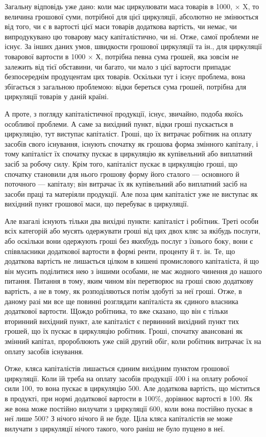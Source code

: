 Загальну відповідь уже дано: коли має циркулювати маса товарів в
1000, × X, то величина грошової суми, потрібної для цієї циркуляції,
абсолютно не змінюється від того, чи є в вартості цієї маси товарів
додаткова вартість, чи немає, чи випродукувано цю товарову масу
капіталістично, чи ні. Отже, самої проблеми не існує. За інших
даних умов, швидкости грошової циркуляції та ін., для циркуляції товарової
вартости в 1000 × Х, потрібна певна сума грошей, яка
зовсім не залежить від тієї обставини, чи багато, чи мало з цієї вартосги
припадає безпосереднім продуцентам цих товарів. Оскільки тут і існує
проблема, вона збігається з загальною проблемою: відки береться сума
грошей, потрібна для циркуляції товарів у даній країні.

А проте, з погляду капіталістичної продукції, існує, звичайно, подоба
якоїсь особливої проблеми. А саме за вихідний пункт, відки гроші пускається
в циркуляцію, тут виступає капіталіст. Гроші, що їх витрачає
робітник на оплату засобів свого існування, існують спочатку як грошова
форма змінного капіталу, і тому капіталіст їх спочатку пускає в
циркуляцію як купівельний або виплатний засіб за робочу силу. Крім
того, капіталіст пускає в циркуляцію гроші, що спочатку становили для
нього грошову форму його сталого — основного й поточного — капіталу;
він витрачає їх як купівельний або виплатний засіб на засоби праці та
матеріяли продукції. Але поза цим капіталіст уже не виступає як вихідний
пункт грошової маси, що перебуває в циркуляції.

Але взагалі існують тільки два вихідні пункти: капіталіст і робітник.
Треті особи всіх категорій або мусять одержувати гроші від цих двох
кляс за якібудь послуги, або оскільки вони одержують гроші без якихбудь
послуг з їхнього боку, вони є співвласники додаткової вартости в
формі ренти, проценту й т. ін. Те, що додаткова вартість не лишається
цілком в кишені промислового капіталіста, й що він мусить поділитися
нею з іншими особами, не має жодного чинення до нашого питання.
Питання в тому, яким чином він перетворює на гроші свою додаткову
вартість, а не в тому, як розподіляються потім здобуті за неї гроші.
Отже, в даному разі ми все ще повинні розглядати капіталіста як єдиного
власника додаткової вартости. Щождо робітника, то вже сказано, що
він є тільки вторинний вихідний пункт, але капіталіст є первинний
вихідний пункт тих грошей, що їх пускає в циркуляцію робітник. Гроші,
спочатку авансовані як змінний капітал, пророблюють уже свій другий
обіг, коли робітник витрачає їх на оплату засобів існування.

Отже, кляса капіталістів лишається єдиним вихідним пунктом грошової
циркуляції. Коли їй треба на оплату засобів продукції 400
і на оплату робочої сили 100, то вона пускає в циркуляцію
500. Але додаткова вартість, що міститься в продукті, при нормі
додаткової вартости в 100\%, дорівнює вартості в 100. Як
же вона може постійно вилучати з циркуляції 600, коли
вона постійно пускає в неї лише 500? З нічого нічого й не
буде. Ціла кляса капіталістів не може вилучати з циркуляції нічого такого,
чого раніш не було пущено в неї.
